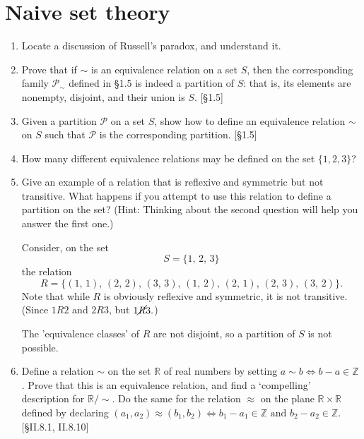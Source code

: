 \section{Naive set theory}
\begin{enumerate}
    \item Locate a discussion of Russell's paradox, and understand it.

    \item Prove that if $\sim$ is an equivalence relation on a set $S$, then the corresponding family $\mathcal{P}_{\sim}$ defined in \S1.5 is indeed a partition of $S$: that is, its elements are nonempty, disjoint, and their union is $S$. [\S1.5]

    \item Given a partition $\mathcal{P}$ on a set $S$, show how to define an equivalence relation $\sim$ on $S$ such that $\mathcal{P}$ is the corresponding partition. [\S1.5]

    \item How many different equivalence relations may be defined on the set $\{1, 2, 3\}$?

    \item Give an example of a relation that is reflexive and symmetric but not transitive. What happens if you attempt to use this relation to define a partition on the set? (Hint: Thinking about the second question will help you answer the first one.)
    
    \begin{solution}
        Consider, on the set
        \[ S = \{1, \, 2, \, 3\} \]  
        the relation
        \[
            R = \{(1, \, 1), \, (2, \, 2), \, (3, \, 3), \, (1, \, 2), \, (2, \, 1), \, (2, \, 3), \, (3, \, 2)\}.
        \]
        Note that while $R$ is obviously reflexive and symmetric, it is not transitive. (Since $1R2$ and $2R3$, but $1 \cancel{R} 3.$)

        The 'equivalence classes' of $R$ are not disjoint, so a partition of $S$ is not possible.
    \end{solution}

    \item Define a relation $\sim$ on the set $\mathbb{R}$ of real numbers by setting $a \sim b \iff b-a \in \mathbb{Z}$. Prove that this is an equivalence relation, and find a `compelling' description for $\mathbb{R}/\sim$. Do the same for the relation $\approx$ on the plane $\mathbb{R} \times \mathbb{R}$ defined by declaring $(a_1, a_2) \approx (b_1, b_2) \iff b_1 - a_1 \in \mathbb{Z} \text{ and } b_2 - a_2 \in \mathbb{Z}$. [\S II.8.1, II.8.10]
\end{enumerate}
